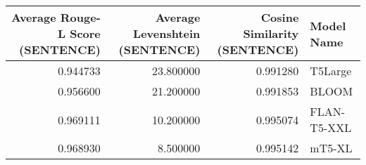 \begin{tabular}{rrrl}
\toprule
Average Rouge-L Score (SENTENCE) & Average Levenshtein (SENTENCE) & Cosine Similarity (SENTENCE) & Model Name \\
\midrule
0.944733 & 23.800000 & 0.991280 & T5Large \\
0.956600 & 21.200000 & 0.991853 & BLOOM \\
0.969111 & 10.200000 & 0.995074 & FLAN-T5-XXL \\
0.968930 & 8.500000 & 0.995142 & mT5-XL \\
\bottomrule
\end{tabular}
